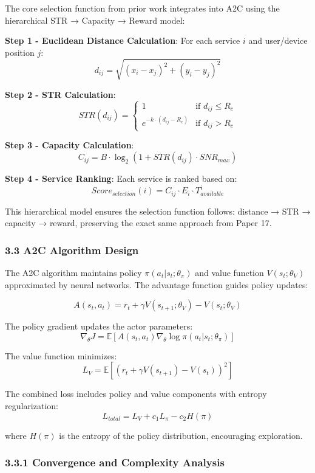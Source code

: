 The core selection function from prior work integrates into A2C using
the hierarchical STR → Capacity → Reward model:

\textbf{Step 1 - Euclidean Distance Calculation}: For each service \(i\)
and user/device position \(j\):
\[d_{ij} = \sqrt{(x_i - x_j)^2 + (y_i - y_j)^2}\]

\textbf{Step 2 - STR Calculation}:
\[STR(d_{ij}) = \begin{cases} 1 & \text{if } d_{ij} \leq R_c \\ e^{-k \cdot (d_{ij} - R_c)} & \text{if } d_{ij} > R_c \end{cases}\]

\textbf{Step 3 - Capacity Calculation}:
\[C_{ij} = B \cdot \log_2(1 + STR(d_{ij}) \cdot SNR_{max})\]

\textbf{Step 4 - Service Ranking}: Each service is ranked based on:
\[Score_{selection}(i) = C_{ij} \cdot E_i \cdot T_{available}^i\]

This hierarchical model ensures the selection function follows: distance
→ STR → capacity → reward, preserving the exact same approach from Paper
17.

\hypertarget{a2c-algorithm-design}{%
	\subsubsection{3.3 A2C Algorithm Design}\label{a2c-algorithm-design}}

The A2C algorithm maintains policy \(\pi(a_t|s_t; \theta_\pi)\) and
value function \(V(s_t; \theta_V)\) approximated by neural networks. The
advantage function guides policy updates:

\[A(s_t, a_t) = r_t + \gamma V(s_{t+1}; \theta_V) - V(s_t; \theta_V)\]

The policy gradient updates the actor parameters:
\[\nabla_\theta J = \mathbb{E}[A(s_t, a_t) \nabla_\theta \log \pi(a_t|s_t; \theta_\pi)]\]

The value function minimizes:
\[L_V = \mathbb{E}[(r_t + \gamma V(s_{t+1}) - V(s_t))^2]\]

The combined loss includes policy and value components with entropy
regularization: \[L_{total} = L_V + c_1 L_\pi - c_2 H(\pi)\]

where \(H(\pi)\) is the entropy of the policy distribution, encouraging
exploration.

\hypertarget{convergence-and-complexity-analysis}{%
	\subsubsection{3.3.1 Convergence and Complexity
		Analysis}\label{convergence-and-complexity-analysis}}


